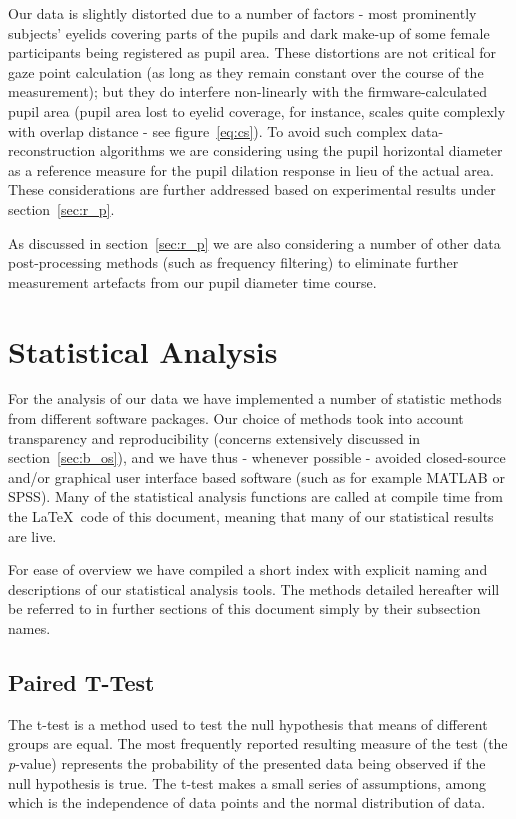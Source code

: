 	    Our data is slightly distorted due to a number of factors - most prominently subjects' eyelids covering parts of the pupils and dark make-up of some female participants being registered as pupil area.
	    These distortions are not critical for gaze point calculation (as long as they remain constant over the course of the measurement); 
	    but they do interfere non-linearly with the firmware-calculated pupil area 
	    (pupil area lost to eyelid coverage, for instance, scales quite complexly with overlap distance - see figure~\ref{eq:cs}).
	    To avoid such complex data-reconstruction algorithms we are considering using the pupil horizontal diameter as a reference measure for the pupil dilation response in lieu of the actual area.
	    These considerations are further addressed based on experimental results under section~\ref{sec:r_p}.
	    
	    As discussed in section~\ref{sec:r_p} we are also considering a number of other data post-processing methods (such as frequency filtering) to eliminate further measurement artefacts from our pupil diameter time course. 
    \section{Statistical Analysis}\label{sec:m_sa}
	For the analysis of our data we have implemented a number of statistic methods from different software packages.
	Our choice of methods took into account transparency and reproducibility (concerns extensively discussed in section~\ref{sec:b_os}), and we have thus - whenever possible - avoided closed-source and/or graphical user interface based software (such as for example MATLAB\textsuperscript{\small\textregistered} or SPSS\textsuperscript{\small\textregistered}).
	Many of the statistical analysis functions are called at compile time from the \LaTeX\ code of this document, meaning that many of our statistical results are live.
	
	For ease of overview we have compiled a short index with explicit naming and descriptions of our statistical analysis tools.
	The methods detailed hereafter will be referred to in further sections of this document simply by their subsection names.
	\subsection{Paired T-Test}\label{sec:m_sa_rs}
	    The t-test is a method used to test the null hypothesis that means of different groups are equal.
	    The most frequently reported resulting measure of the test (the \textit{p}-value) represents the probability of the presented data being observed if the null hypothesis is true. 
	    The t-test makes a small series of assumptions, among which is the independence of data points and the normal distribution of data.
	    
